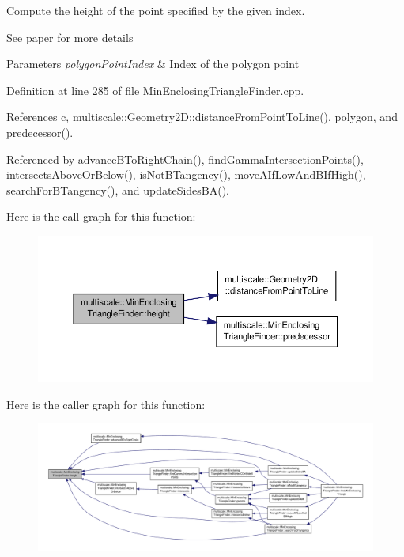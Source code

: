 Compute the height of the point specified by the given index. 

See paper for more details


\begin{DoxyParams}{Parameters}
{\em polygon\-Point\-Index} & Index of the polygon point \\
\hline
\end{DoxyParams}


Definition at line 285 of file Min\-Enclosing\-Triangle\-Finder.\-cpp.



References c, multiscale\-::\-Geometry2\-D\-::distance\-From\-Point\-To\-Line(), polygon, and predecessor().



Referenced by advance\-B\-To\-Right\-Chain(), find\-Gamma\-Intersection\-Points(), intersects\-Above\-Or\-Below(), is\-Not\-B\-Tangency(), move\-A\-If\-Low\-And\-B\-If\-High(), search\-For\-B\-Tangency(), and update\-Sides\-B\-A().



Here is the call graph for this function\-:\nopagebreak
\begin{figure}[H]
\begin{center}
\leavevmode
\includegraphics[width=350pt]{classmultiscale_1_1MinEnclosingTriangleFinder_a4fd0fdc0ccc472a2d15c8d001f65d0f9_cgraph}
\end{center}
\end{figure}




Here is the caller graph for this function\-:\nopagebreak
\begin{figure}[H]
\begin{center}
\leavevmode
\includegraphics[width=350pt]{classmultiscale_1_1MinEnclosingTriangleFinder_a4fd0fdc0ccc472a2d15c8d001f65d0f9_icgraph}
\end{center}
\end{figure}



